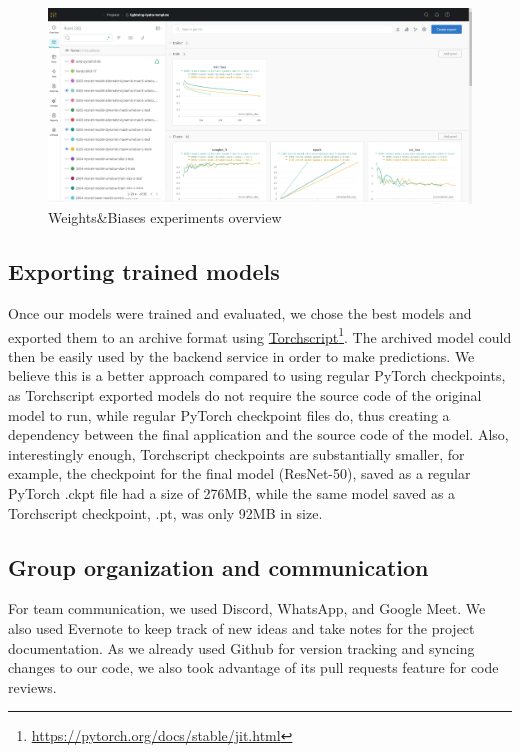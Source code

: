 \documentclass{ol-softwaremanual}
\newcommand{\doclink}[2]{\href{#1}{#2}\footnote{\url{#1}}}
\begin{document}
\begin{figure}[h]
\centering
\includegraphics[width=1.0\textwidth]{images/wandb.png}
\caption{\label{fig:wandb}Weights\&Biases experiments overview}
\end{figure}


\subsection{Exporting trained models}

Once our models were trained and evaluated, we chose the best models and exported them to an archive format using \doclink{https://pytorch.org/docs/stable/jit.html}{Torchscript}. The archived model could then be easily used by the backend service in order to make predictions. We believe this is a better approach compared to using regular PyTorch checkpoints, as Torchscript exported models do not require the source code of the original model to run, while regular PyTorch checkpoint files do, thus creating a dependency between the final application and the source code of the model. Also, interestingly enough, Torchscript checkpoints are substantially smaller, for example, the checkpoint for the final model (ResNet-50), saved as a regular PyTorch .ckpt file had a size of 276MB, while the same model saved as a Torchscript checkpoint, .pt, was only 92MB in size.


\subsection{Group organization and communication}

For team communication, we used Discord, WhatsApp, and Google Meet. We also used Evernote to keep track of new ideas and take notes for the project documentation. As we already used Github for version tracking and syncing changes to our code, we also took advantage of its pull requests feature for code reviews. \clearpage
\end{document}
